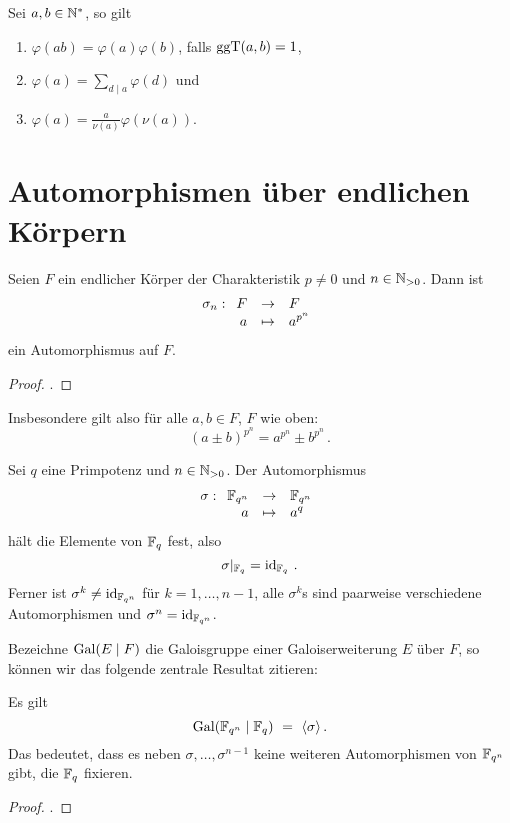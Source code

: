 \begin{lemma}
  \label{lemma:rechenregeln_phifunktion}
  Sei $a,b\in\mathbb{N}^\ast$, so gilt
  \begin{enumerate}
    \item $\varphi(ab) = \varphi(a)\varphi(b)$, falls $\operatorname{ggT}(a,b) = 1$,
    \item $\varphi(a) = \sum_{d\mid a} \varphi(d)$ und
    \item $\varphi(a) = \tfrac{a}{\nu(a)}\varphi(\nu(a))$.
  \end{enumerate}
\end{lemma}

\section{Automorphismen über endlichen Körpern}

\begin{satz}
  \label{satz:frob_auto}
  Seien $F$ ein endlicher Körper der Charakteristik $p\neq 0$ und 
  $n\in \mathbb{N}_{>0}$. Dann ist
  \[ \sigma_n: \funcdef{F &\to& F\\
    a &\mapsto& a^{p^n}}\]
  ein Automorphismus auf $F$.
\end{satz}
\begin{proof}
  \autocite[Corollary 3.18]{wan2003lectures}.
\end{proof}

\begin{bemerkung}
  Insbesondere gilt also für alle $a,b\in F$, $F$ wie oben:
  \[ (a\pm b)^{p^n} = a^{p^n} \pm b^{p^n}\,.\]
\end{bemerkung}

\begin{satz}
  \label{satz:frob_auto}
  Sei $q$ eine Primpotenz und $n\in \mathbb{N}_{>0}$. Der Automorphismus
  \[ \sigma: \funcdef{\F_{q^n} &\to& \F_{q^n}\\
    a &\mapsto& a^q}\]
  hält die Elemente von $\mathbb{F}_q$ fest, also 
  \[ \sigma |_{\mathbb{F}_q} = \operatorname{id}_{\mathbb{F}_q}\,.\]
  Ferner ist $\sigma^k \neq \operatorname{id}_{\mathbb{F}_{q^n}}$ für $k=1,\ldots,n-1$, alle
  $\sigma^k$s sind paarweise verschiedene Automorphismen und 
  $\sigma^n = \operatorname{id}_{\mathbb{F}_{q^n}}$.
\end{satz}


Bezeichne $\operatorname{Gal}(E \mid F)$ die Galoisgruppe einer Galoiserweiterung $E$ über
$F$, so können wir das folgende zentrale Resultat zitieren:

\begin{satz}
  \label{satz:frob_sind_alle_autos}
  Es gilt
  \[ \operatorname{Gal}(\mathbb{F}_{q^n}\mid \mathbb{F}_q) \ =\  \langle \sigma\rangle\,.\]
  Das bedeutet, dass es neben $\sigma,\ldots,\sigma^{n-1}$ keine weiteren
  Automorphismen von $\mathbb{F}_{q^n}$ gibt, die $\mathbb{F}_q$ fixieren.
\end{satz}
\begin{proof}
  \autocite[Theorem 7.3]{wan2003lectures}.
\end{proof}



